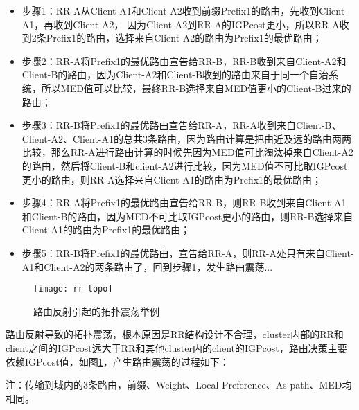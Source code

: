 \begin{itemize}
\item 步骤1：RR-A从Client-A1和Client-A2收到前缀Prefix1的路由，先收到Client-A1，再收到Client-A2， 因为Client-A2到RR-A的IGPcost更小，所以RR-A收到2条Prefix1的路由，选择来自Client-A2的路由为Prefix1的最优路由；
\item 步骤2：RR-A将Prefix1的最优路由宣告给RR-B，RR-B收到来自Client-A2和Client-B的路由，因为Client-A2和Client-B收到的路由来自于同一个自治系统，所以MED值可以比较，最终RR-B选择来自MED值更小的Client-B过来的路由；
\item 步骤3：RR-B将Prefix1的最优路由宣告给RR-A，RR-A收到来自Client-B、Client-A2、Client-A1的总共3条路由，因为路由计算是把由近及远的路由两两比较，那么RR-A进行路由计算的时候先因为MED值可比淘汰掉来自Client-A2的路由，然后将Client-B和client-A2进行比较，因为MED值不可比取IGPcost更小的路由，则RR-A选择来自Client-A1的路由为Prefix1的最优路由；
\item 步骤4：RR-A将Prefix1的最优路由宣告给RR-B，则RR-B收到来自Client-A1和Client-B的路由，因为MED不可比取IGPcost更小的路由，则RR-B选择来自Client-A1的路由为Prefix1的最优路由；
\item 步骤5：RR-B将Prefix1的最优路由，宣告给RR-A，则RR-A处只有来自Client-A1和Client-A2的两条路由了，回到步骤1，发生路由震荡...\\
\end{itemize}


\begin{figure}
  \centering
  \texttt{[image: rr-topo]}
  \caption{路由反射引起的拓扑震荡举例\cite{ibgp2016infocom}}
  \label{fig:rr-topo}
\end{figure}



路由反射导致的拓扑震荡，根本原因是RR结构设计不合理，cluster内部的RR和client之间的IGPcost远大于RR和其他cluster内的client的IGPcost，路由决策主要依赖IGPcost值，如图\ref{fig:rr-topo}，产生路由震荡的过程如下：

注：传输到域内的3条路由，前缀、Weight、Local Preference、As-path、MED均相同。

